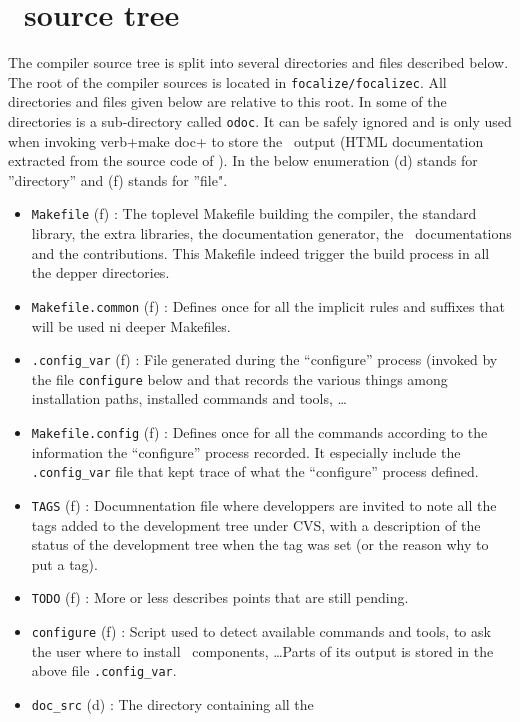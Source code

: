 
\section{\focalizec\ source tree}
The compiler source tree is split into several directories and files
described below. The root of the compiler sources is located in
{\tt focalize/focalizec}. All directories and files given below are
relative to this root. In some of the directories is a sub-directory
called {\tt odoc}. It can be safely ignored and is only used when
invoking verb+make doc+ to store the \ocamldoc\ output (HTML
documentation extracted from the source code of \focalize). In the
below enumeration (d) stands for ''directory'' and (f) stands for
''file".

\begin{itemize}
\item {\tt Makefile} (f) : The toplevel Makefile building the
  compiler, the standard library, the extra libraries, the
  documentation generator, the \focalize\ documentations and the
  contributions. This Makefile indeed trigger the build process in all
  the depper directories.
\item {\tt Makefile.common} (f) : Defines once for all the implicit
  rules and suffixes that will be used ni deeper Makefiles.
\item {\tt .config\_var} (f) : File generated during the ``configure''
  process (invoked by the file {\tt configure} below and that records
  the various things among installation paths, installed commands and
  tools, \ldots
\item {\tt Makefile.config} (f) : Defines once for all the commands
  according to the information the ``configure'' process recorded. It
  especially include the {\tt .config\_var} file that kept trace of what
  the ``configure'' process defined.
\item {\tt TAGS} (f) : Documnentation file where developpers are
  invited to note all the tags added to the development tree under CVS,
  with a description of the status of the development tree when the
  tag was set (or the reason why to put a tag).
\item {\tt TODO} (f) : More or less describes points that are still
  pending.
\item {\tt configure} (f) : Script used to detect available commands
  and tools, to ask the user where to install \focalize\ components,
  \ldots Parts of its output is stored in the above file
  {\tt .config\_var}.
\item {\tt doc\_src} (d) : The directory containing all the

\end{itemize}
